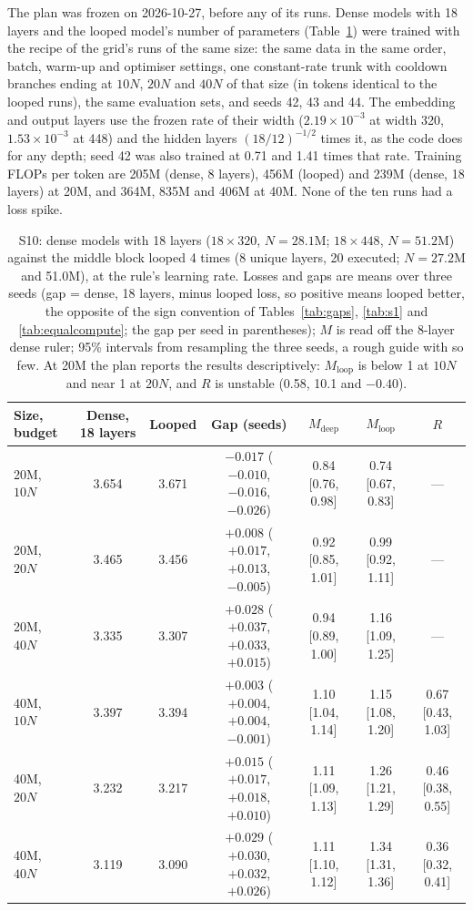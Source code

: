 The plan was frozen on 2026-10-27, before any of its runs. Dense models with 18 layers and the looped model's number of
parameters (Table~\ref{tab:s10}) were trained with the recipe of the grid's runs of the same size: the same data in the
same order, batch, warm-up and optimiser settings, one constant-rate trunk with cooldown branches ending at $10N$, $20N$
and $40N$ of that size (in tokens identical to the looped runs), the same evaluation sets, and seeds 42, 43 and 44. The
embedding and output layers use the frozen rate of their width ($2.19\times10^{-3}$ at width 320, $1.53\times10^{-3}$ at
448) and the hidden layers $(18/12)^{-1/2}$ times it, as the code does for any depth; seed 42 was also trained at 0.71
and 1.41 times that rate. Training FLOPs per token are 205M (dense, 8 layers), 456M (looped) and 239M (dense, 18 layers)
at 20M, and 364M, 835M and 406M at 40M. None of the ten runs had a loss spike.

\begin{table}[h]
  \centering
  \caption{S10: dense models with 18 layers ($18 \times 320$, $N = 28.1$M; $18 \times 448$, $N = 51.2$M) against the
  middle block looped 4 times (8 unique layers, 20 executed; $N = 27.2$M and 51.0M), at the rule's learning rate. Losses
  and gaps are means over three seeds (gap = dense, 18 layers, minus looped loss, so positive means looped better, the opposite of the sign convention of Tables~\ref{tab:gaps}, \ref{tab:s1} and \ref{tab:equalcompute}; the gap per seed in parentheses); $M$ is read off the
  8-layer dense ruler; 95\% intervals from resampling the three seeds, a rough guide with so few. At 20M the plan reports the results descriptively:
  $M_{\mathrm{loop}}$ is below 1 at $10N$ and near 1 at $20N$, and $R$ is unstable (0.58, 10.1 and $-0.40$).}
  \label{tab:s10}
  \footnotesize
  \setlength{\tabcolsep}{2.6pt}
  \begin{tabular}{lcccccc}
    \toprule
    Size, budget & Dense, 18 layers & Looped & Gap (seeds) & $M_{\mathrm{deep}}$ & $M_{\mathrm{loop}}$ & $R$ \\
    \midrule
    20M, $10N$ & 3.654 & 3.671 & $-0.017$ ($-0.010$, $-0.016$, $-0.026$) & 0.84 [0.76, 0.98] & 0.74 [0.67, 0.83] & --- \\
    20M, $20N$ & 3.465 & 3.456 & $+0.008$ ($+0.017$, $+0.013$, $-0.005$) & 0.92 [0.85, 1.01] & 0.99 [0.92, 1.11] & --- \\
    20M, $40N$ & 3.335 & 3.307 & $+0.028$ ($+0.037$, $+0.033$, $+0.015$) & 0.94 [0.89, 1.00] & 1.16 [1.09, 1.25] & --- \\
    40M, $10N$ & 3.397 & 3.394 & $+0.003$ ($+0.004$, $+0.004$, $-0.001$) & 1.10 [1.04, 1.14] & 1.15 [1.08, 1.20] & 0.67 [0.43, 1.03] \\
    40M, $20N$ & 3.232 & 3.217 & $+0.015$ ($+0.017$, $+0.018$, $+0.010$) & 1.11 [1.09, 1.13] & 1.26 [1.21, 1.29] & 0.46 [0.38, 0.55] \\
    40M, $40N$ & 3.119 & 3.090 & $+0.029$ ($+0.030$, $+0.032$, $+0.026$) & 1.11 [1.10, 1.12] & 1.34 [1.31, 1.36] & 0.36 [0.32, 0.41] \\
    \bottomrule
  \end{tabular}
\end{table}

